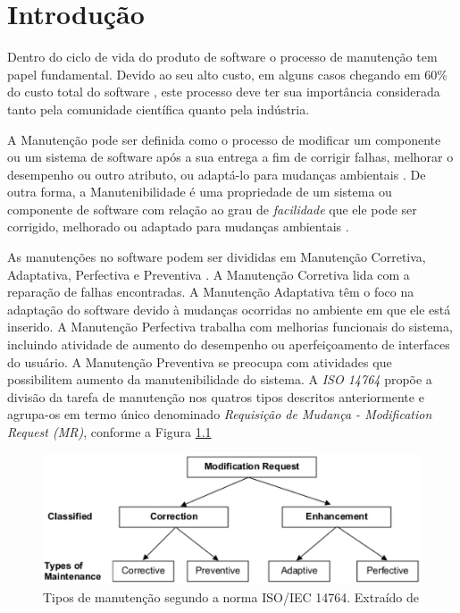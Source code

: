 \documentclass[msc,proposal,hidelot,hideabstract]{ppgccufmg} %
\begin{document}
\chapter{Introdução}
\label{ch:intro}
Dentro do ciclo de vida do produto de software o processo de manutenção tem
papel fundamental. Devido ao seu alto custo, em alguns casos chegando em 60\%
do custo total do software \cite{kaur2015review}, este processo deve ter sua
importância considerada tanto pela comunidade científica quanto pela indústria.

A Manutenção pode ser definida como o processo de modificar um componente ou um
sistema de software após a sua entrega a fim de corrigir falhas, melhorar o
desempenho ou outro atributo, ou adaptá-lo para mudanças ambientais
\cite{159342}. De outra forma, a Manutenibilidade é uma propriedade de um
sistema ou componente de software com relação ao grau de \textit{facilidade}
que ele pode ser corrigido, melhorado ou adaptado para mudanças ambientais \cite{159342}.

As manutenções no software podem ser divididas em Manutenção Corretiva, Adaptativa, Perfectiva e Preventiva \cite{Lientz:1980:SMM:601062,159342}. A
Manutenção Corretiva lida com a reparação de falhas encontradas. A Manutenção
Adaptativa têm o foco na adaptação do software devido à mudanças ocorridas no
ambiente em que ele está inserido. A Manutenção Perfectiva trabalha com
melhorias funcionais do sistema, incluindo atividade de aumento do desempenho
ou aperfeiçoamento de interfaces do usuário. A Manutenção Preventiva se preocupa com atividades
que possibilitem aumento da manutenibilidade do sistema. A \textit{ISO 14764}
\cite{1703974} propõe a divisão da tarefa de manutenção nos quatros tipos
descritos anteriormente e agrupa-os em termo único denominado
\textit{Requisição de Mudança - Modification Request (MR)}, conforme a Figura \ref{fig:modification-request}

\begin{figure}[hbtp]
\centering
\includegraphics[width=.75\textwidth]{../img/modification_request.eps}
\caption{Tipos de manutenção segundo a norma ISO/IEC 14764. Extraído de
  \cite{1703974}}
\label{fig:modification-request}
\end{figure}
\end{document}
